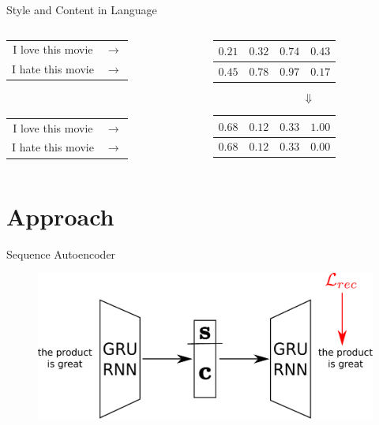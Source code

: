 \documentclass[aspectratio=169]{beamer}
\begin{document}
\begin{frame}{Style and Content in Language}
	\centering
	\begin{columns}[T]
		\begin{column}{.3\textwidth}
			\centering
			\begin{tabular}{ c c }
				I love this movie & $\rightarrow$ \\
				I hate this movie & $\rightarrow$ \\
			\end{tabular}\\
			\vspace{1.8cm}
			\begin{tabular}{ c c }
				I love this movie & $\rightarrow$ \\
				I hate this movie & $\rightarrow$ \\
			\end{tabular}
		\end{column}
		\hfill
		\begin{column}{.6\textwidth}
			\centering
			\begin{tabular}{ | c | c | c | c | }
				\hline
				$0.21$ & $0.32$ & $0.74$ & $0.43$ \\
				\hline
				\hline
				$0.45$ & $0.78$ & $0.97$ & $0.17$ \\
				\hline
			\end{tabular}
			{\Huge$$\Downarrow$$}
			\begin{tabular}{ | c | c | c | c | }
				\hline
				$0.68$ & $0.12$ & $0.33$ & {\color{red}$1.00$} \\
				\hline
				\hline
				$0.68$ & $0.12$ & $0.33$ & {\color{red}$0.00$} \\
				\hline
			\end{tabular}
		\end{column}
	\end{columns}
\end{frame}

% 

\section{Approach}

\begin{frame}{Sequence Autoencoder}
	\centering
	\begin{figure}[ht]
		\includegraphics[width=\textwidth]{images/overview-training-1}
	\end{figure}
\end{frame}
\end{document}
